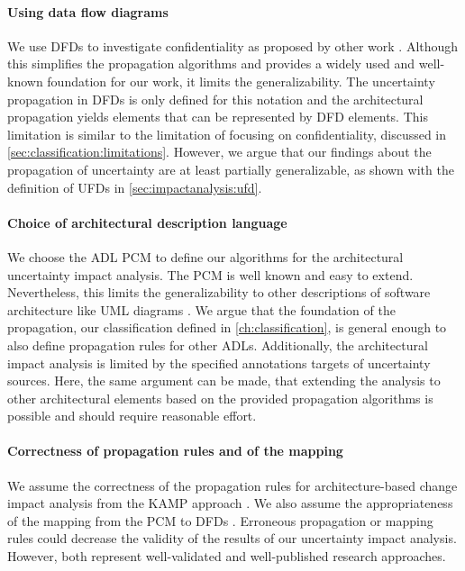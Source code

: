 \paragraph{Using data flow diagrams}
We use \acp{DFD} to investigate confidentiality as proposed by other work \cite{seifermann_detecting_2022,sion_security_2020,schneider_how_2024}.
Although this simplifies the propagation algorithms and provides a widely used and well-known foundation for our work, it limits the generalizability.
The uncertainty propagation in \acp{DFD} is only defined for this notation and the architectural propagation yields elements that can be represented by \ac{DFD} elements.
This limitation is similar to the limitation of focusing on confidentiality, discussed in \autoref{sec:classification:limitations}.
However, we argue that our findings about the propagation of uncertainty are at least partially generalizable, as shown with the definition of \acp{UFD} in \autoref{sec:impactanalysis:ufd}.

\paragraph{Choice of architectural description language}
We choose the \ac{ADL} \ac{PCM} to define our algorithms for the architectural uncertainty impact analysis.
The \ac{PCM} is well known \cite{sobhy_evaluation_2021} and easy to extend.
Nevertheless, this limits the generalizability to other descriptions of software architecture like \ac{UML} diagrams \cite{object_management_group_unified_2015}.
We argue that the foundation of the propagation, our classification defined in \autoref{ch:classification}, is general enough to also define propagation rules for other \acp{ADL}.
Additionally, the architectural impact analysis is limited by the specified annotations targets of uncertainty sources.
Here, the same argument can be made, that extending the analysis to other architectural elements based on the provided propagation algorithms is possible and should require reasonable effort.

\paragraph{Correctness of propagation rules and of the mapping}
We assume the correctness of the propagation rules for architecture-based change impact analysis from the \ac{KAMP} approach \cite{rostami_architecture-based_2015,rostami_architecture-based_2017,busch_architecture-based_2020}.
We also assume the appropriateness of the mapping from the \ac{PCM} to \acp{DFD} \cite{seifermann_data-driven_2019,seifermann_detecting_2022,seifermann_architectural_2022}.
Erroneous propagation or mapping rules could decrease the validity of the results of our uncertainty impact analysis.
However, both represent well-validated and well-published research approaches.

